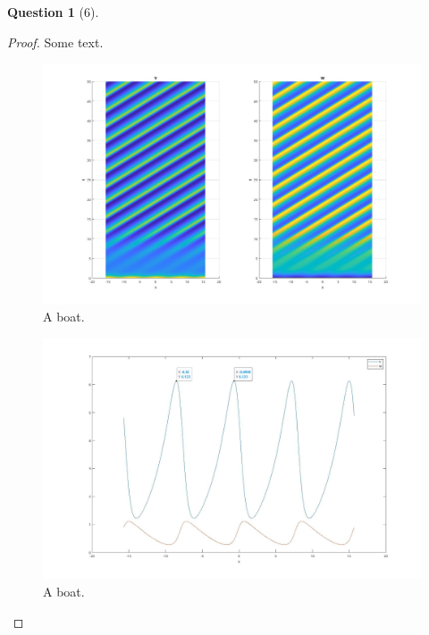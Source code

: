 \documentclass[11pt]{article}
\theoremstyle{quest}
\newtheorem*{question}{Question}
\begin{document}
\begin{question}[6]
    
\end{question}
\begin{proof}
    Some text.
    \begin{figure}[h!]
        \includegraphics[width=\linewidth]{figures/Q6_fig1.jpg}
        \caption{A boat.}
        \label{fig:fig2}
    \end{figure}
    \begin{figure}[h!]
        \includegraphics[width=\linewidth]{figures/Q6_fig2.jpg}
        \caption{A boat.}
        \label{fig:fig2}
    \end{figure}
     
\end{proof}
\end{document}
